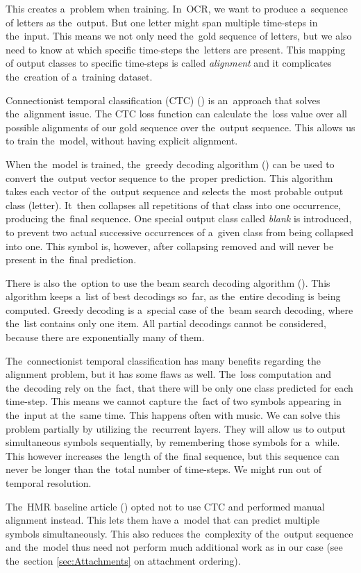This creates a~problem when training. In~OCR, we want to produce a~sequence of letters as the~output. But one letter might span multiple time-steps in the~input. This means we not only need the~gold sequence of letters, but we also need to know at which specific time-steps the~letters are present. This mapping of output classes to specific time-steps is called \emph{alignment} and it complicates the~creation of a~training dataset.

Connectionist temporal classification (CTC) (\cite{CTC}) is an~approach that solves the~alignment issue. The CTC loss function can calculate the~loss value over all possible alignments of our gold sequence over the~output sequence. This allows us to train the~model, without having explicit alignment.

When the~model is trained, the~greedy decoding algorithm (\cite{CTC}) can be used to convert the~output vector sequence to the~proper prediction. This algorithm takes each vector of the~output sequence and selects the~most probable output class (letter). It~then collapses all repetitions of that class into one occurrence, producing the~final sequence. One special output class called \emph{blank} is introduced, to prevent two actual successive occurrences of a~given class from being collapsed into one. This symbol is, however, after collapsing removed and will never be present in the~final prediction.

There is also the~option to use the beam search decoding algorithm (\cite{CtcBeamSearch}). This algorithm keeps a~list of best decodings so~far, as the~entire decoding is being computed. Greedy decoding is a~special case of the~beam search decoding, where the~list contains only one item. All partial decodings cannot be considered, because there are exponentially many of them.

The~connectionist temporal classification has many benefits regarding the alignment problem, but it has some flaws as well. The~loss computation and the~decoding rely on the~fact, that there will be only one class predicted for each time-step. This means we cannot capture the~fact of two symbols appearing in the~input at the~same time. This happens often with music. We can solve this problem partially by utilizing the~recurrent layers. They will allow us to output simultaneous symbols sequentially, by remembering those symbols for a~while. This however increases the~length of the~final sequence, but this sequence can never be longer than the~total number of time-steps. We might run out of temporal resolution.

The~HMR baseline article (\cite{HmrBaseline}) opted not to use CTC and performed manual alignment instead. This lets them have a~model that can predict multiple symbols simultaneously. This also reduces the~complexity of the~output sequence and the~model thus need not perform much additional work as in our case (see the~section \ref{sec:Attachments} on attachment ordering).
